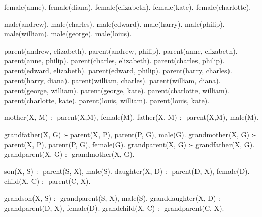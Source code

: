 
female(anne).
female(diana).		
female(elizabeth).
female(kate).
female(charlotte).
					
male(andrew).		
male(charles).		
male(edward).		
male(harry).		
male(philip).		
male(william).
male(george).
male(loius).		
			
parent(andrew, elizabeth).
parent(andrew, philip).
parent(anne, elizabeth).
parent(anne, philip).
parent(charles, elizabeth).
parent(charles, philip).
parent(edward, elizabeth).
parent(edward, philip).
parent(harry, charles).
parent(harry, diana).
parent(william, charles).
parent(william, diana).
parent(george, william).
parent(george, kate).
parent(charlotte, william).
parent(charlotte, kate).
parent(louis, william).
parent(louis, kate).

mother(X, M) :- parent(X,M), female(M).
father(X, M) :- parent(X,M), male(M).


grandfather(X, G) :- parent(X, P), parent(P, G), male(G).
grandmother(X, G) :- parent(X, P), parent(P, G), female(G).
grandparent(X, G) :- grandfather(X, G).
grandparent(X, G) :- grandmother(X, G).

son(X, S) :- parent(S, X), male(S).
daughter(X, D) :- parent(D, X), female(D).
child(X, C) :- parent(C, X).

grandson(X, S) :- grandparent(S, X), male(S).
granddaughter(X, D) :- grandparent(D, X), female(D).
grandchild(X, C) :- grandparent(C, X).